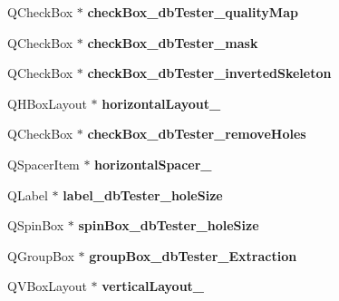\begin{DoxyCompactItemize}
\item 
\mbox{\label{class_ui___main_window_ad7f2d702ae8e652e135d5609893b2fe8}} 
Q\+Check\+Box $\ast$ {\bfseries check\+Box\+\_\+db\+Tester\+\_\+quality\+Map}
\item 
\mbox{\label{class_ui___main_window_a55f749fd75fc80f9cf02f24f225b045a}} 
Q\+Check\+Box $\ast$ {\bfseries check\+Box\+\_\+db\+Tester\+\_\+mask}
\item 
\mbox{\label{class_ui___main_window_a72009f52b9e0b69fe0a46e747616b6c4}} 
Q\+Check\+Box $\ast$ {\bfseries check\+Box\+\_\+db\+Tester\+\_\+inverted\+Skeleton}
\item 
\mbox{\label{class_ui___main_window_a818cb21bd8f34bb38e12b93b9ec2e5e8}} 
Q\+H\+Box\+Layout $\ast$ {\bfseries horizontal\+Layout\+\_}
\item 
\mbox{\label{class_ui___main_window_abf8913226157d23cf8b785cc1dfffce3}} 
Q\+Check\+Box $\ast$ {\bfseries check\+Box\+\_\+db\+Tester\+\_\+remove\+Holes}
\item 
\mbox{\label{class_ui___main_window_a0269550065cc414e7ad7745049968540}} 
Q\+Spacer\+Item $\ast$ {\bfseries horizontal\+Spacer\+\_}
\item 
\mbox{\label{class_ui___main_window_ae2d97136c96f5f05b926f3b12a20936f}} 
Q\+Label $\ast$ {\bfseries label\+\_\+db\+Tester\+\_\+hole\+Size}
\item 
\mbox{\label{class_ui___main_window_a93ef3f002a389b4f66db6578b7d83589}} 
Q\+Spin\+Box $\ast$ {\bfseries spin\+Box\+\_\+db\+Tester\+\_\+hole\+Size}
\item 
\mbox{\label{class_ui___main_window_ae1671e438ae7e3783a519667c5afdded}} 
Q\+Group\+Box $\ast$ {\bfseries group\+Box\+\_\+db\+Tester\+\_\+\+Extraction}
\item 
\mbox{\label{class_ui___main_window_a667e8e2f5a11c2548b5efde636436960}} 
Q\+V\+Box\+Layout $\ast$ {\bfseries vertical\+Layout\+\_}

\end{DoxyCompactItemize}
